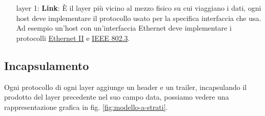 \begin{enumerate}

        
    \item[layer 1:] \textbf{Link}: È il layer più vicino al mezzo fisico su cui viaggiano i dati, ogni host deve implementare il protocollo usato per la specifica interfaccia che usa. Ad esempio un'host con un'interfaccia Ethernet deve implementare i protocolli \href{https://en.wikipedia.org/wiki/Ethernet_frame#Ethernet_II}{Ethernet II} e \href{https://en.wikipedia.org/wiki/IEEE_802.3}{IEEE 802.3}.

\end{enumerate}

\subsection{Incapsulamento}

Ogni protocollo di ogni layer aggiunge un header e un trailer, incapsulando il prodotto del layer precedente nel suo campo data, possiamo vedere una rappresentazione grafica in fig. \ref{fig:modello-a-strati}.


